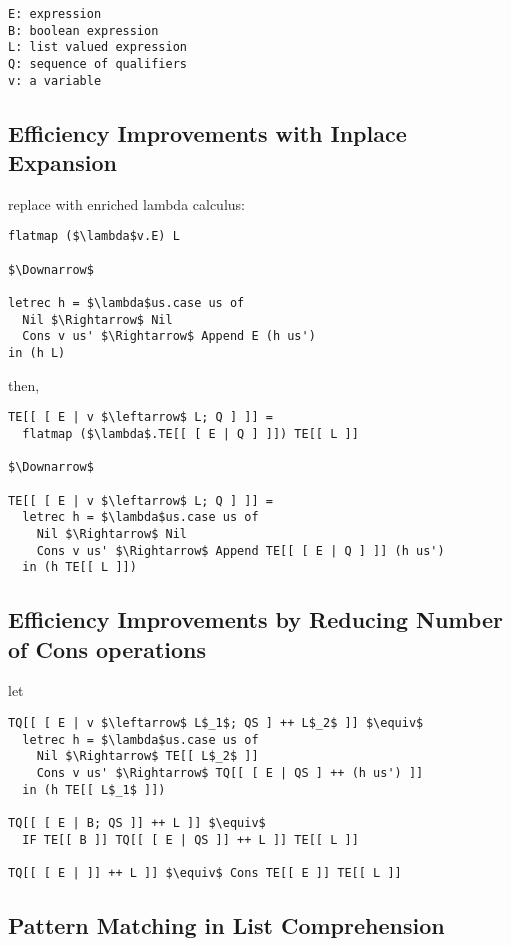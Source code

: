 \documentclass[8pt]{extarticle}
\begin{document}
\begin{multicols*}{2}
\begin{lstlisting}
E: expression
B: boolean expression
L: list valued expression
Q: sequence of qualifiers
v: a variable
\end{lstlisting}

\subsection{Efficiency Improvements with Inplace Expansion}
replace with enriched lambda calculus:

\begin{lstlisting}
flatmap ($\lambda$v.E) L

$\Downarrow$
  
letrec h = $\lambda$us.case us of
  Nil $\Rightarrow$ Nil
  Cons v us' $\Rightarrow$ Append E (h us')
in (h L)
\end{lstlisting}

then,

\begin{lstlisting}
TE[[ [ E | v $\leftarrow$ L; Q ] ]] =
  flatmap ($\lambda$.TE[[ [ E | Q ] ]]) TE[[ L ]]

$\Downarrow$

TE[[ [ E | v $\leftarrow$ L; Q ] ]] =
  letrec h = $\lambda$us.case us of
    Nil $\Rightarrow$ Nil
    Cons v us' $\Rightarrow$ Append TE[[ [ E | Q ] ]] (h us')
  in (h TE[[ L ]])
\end{lstlisting}

\subsection{Efficiency Improvements by Reducing Number of Cons operations}

let

\begin{lstlisting}
TQ[[ [ E | v $\leftarrow$ L$_1$; QS ] ++ L$_2$ ]] $\equiv$
  letrec h = $\lambda$us.case us of
    Nil $\Rightarrow$ TE[[ L$_2$ ]]
    Cons v us' $\Rightarrow$ TQ[[ [ E | QS ] ++ (h us') ]]
  in (h TE[[ L$_1$ ]])

TQ[[ [ E | B; QS ]] ++ L ]] $\equiv$
  IF TE[[ B ]] TQ[[ [ E | QS ]] ++ L ]] TE[[ L ]]

TQ[[ [ E | ]] ++ L ]] $\equiv$ Cons TE[[ E ]] TE[[ L ]]
\end{lstlisting}

\subsection{Pattern Matching in List Comprehension}


\end{multicols*}
\end{document}
